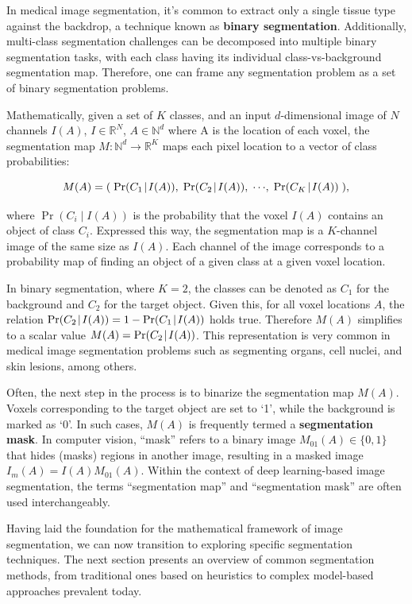 In medical image segmentation, it's common to extract only a single tissue type against the backdrop, a technique known as \textbf{binary segmentation}. Additionally, multi-class segmentation challenges can be decomposed into multiple binary segmentation tasks, with each class having its individual class-vs-background segmentation map. Therefore, one can frame any segmentation problem as a set of binary segmentation problems.

Mathematically, given a set of $K$ classes, and an input $d$-dimensional image of $N$ channels $I(A)$, $I \in \mathbb{R}^{N}$, $A \in \mathbb{N}^d$ where A is the location of each voxel, the segmentation map $M : \mathbb{N}^d \rightarrow \mathbb{R}^K$ maps each pixel location to a vector of class probabilities:

\begin{equation}
M(A) = (\;\operatorname{Pr}({C_1}\!\mid\!{I(A)}),\; \operatorname{Pr}({C_2}\!\mid\!{I(A)}),\; \cdots\!,\;  \operatorname{Pr}({C_{K}}\!\mid\!{I(A)})\;),
\end{equation}

where $\operatorname{Pr} (C_i \!\mid\! I(A))$ is the probability that the voxel $I(A)$ contains an object of class $C_i$. Expressed this way, the segmentation map is a $K$-channel image of the same size as $I(A)$. Each channel of the image corresponds to a probability map of finding an object of a given class at a given voxel location. 

In binary segmentation, where $K=2$, the classes can be denoted as $C_1$ for the background and $C_2$ for the target object. Given this, for all voxel locations $A$, the relation $\operatorname{Pr}({C_2}\!\mid\!{I(A)}) = 1 - \operatorname{Pr}({C_1}\!\mid\!{I(A)})$ holds true. Therefore $M(A)$ simplifies to a scalar value $M(A) = \operatorname{Pr}({C_2}\!\mid\!{I(A)})$. This representation is very common in medical image segmentation problems such as segmenting organs, cell nuclei, and skin lesions, among others.

Often, the next step in the process is to binarize the segmentation map $M(A)$. Voxels corresponding to the target object are set to `1', while the background is marked as `0'. In such cases, $M(A)$ is frequently termed a \textbf{segmentation mask}. In computer vision, ``mask'' refers to a binary image $M_{01}(A) \in \{0, 1\}$ that hides (masks) regions in another image, resulting in a masked image $I_m(A) = I(A) M_{01}(A)$. Within the context of deep learning-based image segmentation, the terms ``segmentation map'' and ``segmentation mask'' are often used interchangeably.

Having laid the foundation for the mathematical framework of image segmentation, we can now transition to exploring specific segmentation techniques. The next section presents an overview of common segmentation methods, from traditional ones based on heuristics to complex model-based approaches prevalent today.

